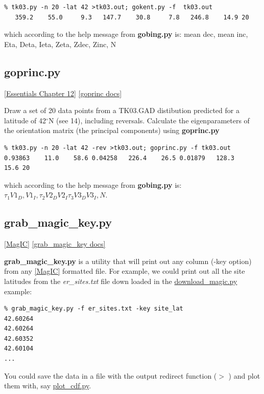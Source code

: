 \documentclass[11pt]{book}
\begin{document}
{{{\begin{verbatim}
% tk03.py -n 20 -lat 42 >tk03.out; gokent.py -f  tk03.out
   359.2    55.0     9.3   147.7    30.8     7.8   246.8    14.9 20
\end{verbatim}

\noindent  which according to the help message from {\bf gobing.py} is:   mean dec, mean inc, Eta, Deta, Ieta, Zeta, Zdec, Zinc, N


\subsection{goprinc.py} 
 \href{http://magician.ucsd.edu/Essentials_2/WebBook2ch11.html#ch11}{[Essentials Chapter 12]}
 \href{http://earthref.org/PmagPy/pmagpydocs/goprinc-module.html}{[goprinc docs]}

Draw a set of 20 data points  from a TK03.GAD distibution predicted for a latitude of 42$^{\circ}$N (see  14), including reversals.  Calculate the eigenparameters of the orientation matrix (the principal components)  using {\bf goprinc.py} 

\begin{verbatim}
% tk03.py -n 20 -lat 42 -rev >tk03.out; goprinc.py -f tk03.out
0.93863    11.0    58.6 0.04258   226.4    26.5 0.01879   128.3    15.6 20
\end{verbatim}

\noindent  which according to the help message from {\bf gobing.py} is:    $\tau_1 V1_D, V1_I,  \tau_2 V2_D V2_I \tau_3 V3_D V3_I, N$.

\subsection{grab\_magic\_key.py}
\href{#MagIC}{[MagIC]}
\href{http://earthref.org/PmagPy/pmagpydocs/grab_magic_key-module.html}{[grab\_magic\_key docs]}

{\bf grab\_magic\_key.py} is  a utility that will print out any column (-key option) from any \href{#MagIC}{[MagIC]} formatted file.  For example, we could print out all the site latitudes from the  {\it er\_sites.txt} file down loaded in the \href{#download_magic.py}{download\_magic.py} example:

\begin{verbatim}
% grab_magic_key.py -f er_sites.txt -key site_lat
42.60264
42.60264
42.60352
42.60104
...
\end{verbatim}

You could save the data in a file with the output redirect function ($>$ ) and plot them with, say \href{#plot_cdf.py}{plot\_cdf.py}.  

}}}
\end{document}

